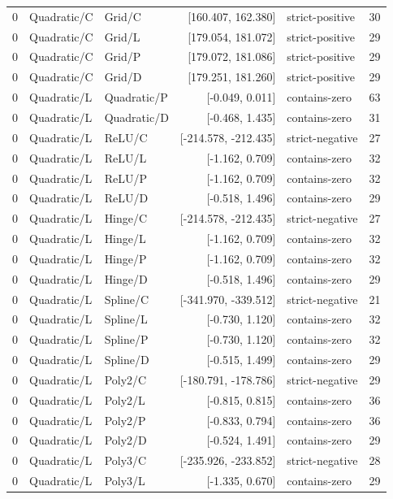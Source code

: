 \begin{longtable}{lllrlr}
0 & Quadratic/C & Grid/C & [160.407, 162.380] & strict-positive & 30 \\
0 & Quadratic/C & Grid/L & [179.054, 181.072] & strict-positive & 29 \\
0 & Quadratic/C & Grid/P & [179.072, 181.086] & strict-positive & 29 \\
0 & Quadratic/C & Grid/D & [179.251, 181.260] & strict-positive & 29 \\
0 & Quadratic/L & Quadratic/P & [-0.049, 0.011] & contains-zero & 63 \\
0 & Quadratic/L & Quadratic/D & [-0.468, 1.435] & contains-zero & 31 \\
0 & Quadratic/L & ReLU/C & [-214.578, -212.435] & strict-negative & 27 \\
0 & Quadratic/L & ReLU/L & [-1.162, 0.709] & contains-zero & 32 \\
0 & Quadratic/L & ReLU/P & [-1.162, 0.709] & contains-zero & 32 \\
0 & Quadratic/L & ReLU/D & [-0.518, 1.496] & contains-zero & 29 \\
0 & Quadratic/L & Hinge/C & [-214.578, -212.435] & strict-negative & 27 \\
0 & Quadratic/L & Hinge/L & [-1.162, 0.709] & contains-zero & 32 \\
0 & Quadratic/L & Hinge/P & [-1.162, 0.709] & contains-zero & 32 \\
0 & Quadratic/L & Hinge/D & [-0.518, 1.496] & contains-zero & 29 \\
0 & Quadratic/L & Spline/C & [-341.970, -339.512] & strict-negative & 21 \\
0 & Quadratic/L & Spline/L & [-0.730, 1.120] & contains-zero & 32 \\
0 & Quadratic/L & Spline/P & [-0.730, 1.120] & contains-zero & 32 \\
0 & Quadratic/L & Spline/D & [-0.515, 1.499] & contains-zero & 29 \\
0 & Quadratic/L & Poly2/C & [-180.791, -178.786] & strict-negative & 29 \\
0 & Quadratic/L & Poly2/L & [-0.815, 0.815] & contains-zero & 36 \\
0 & Quadratic/L & Poly2/P & [-0.833, 0.794] & contains-zero & 36 \\
0 & Quadratic/L & Poly2/D & [-0.524, 1.491] & contains-zero & 29 \\
0 & Quadratic/L & Poly3/C & [-235.926, -233.852] & strict-negative & 28 \\
0 & Quadratic/L & Poly3/L & [-1.335, 0.670] & contains-zero & 29 \\

\end{longtable}
